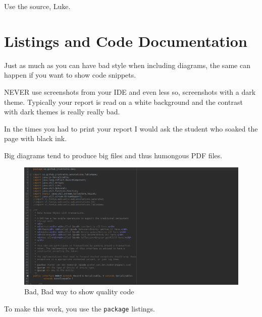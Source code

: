\def\TheFile{ch05_codelisting.tex}
\begin{savequote}[15cm]
  \vspace{-30mm}
  \sffamily\raggedleft
  Use the source, Luke.
\end{savequote}

\chapter{Listings and Code Documentation}
\label{chap:listings}
Just as much as you can have bad style when including diagrams, the same can happen if
you want to show code snippets.

\begin{Itemize}
\item {\color{red!60!black}\Huge{}NEVER} use screenshots from your IDE and even less so, screenshots with a dark theme.
  Typically your report is read on a white background and the contrast with dark themes is really really bad.
\item In the times you had to print your report I would ask the student who soaked the page with black ink.
\item Big diagrams tend to produce big files and thus humongous PDF files.
\end{Itemize}

\begin{figure}
  \caption{Bad, Bad way to show quality code}
  \includegraphics[width=\textwidth]{images/dao.png}
\end{figure}

To make this work, you use the \texttt{package} listings.


